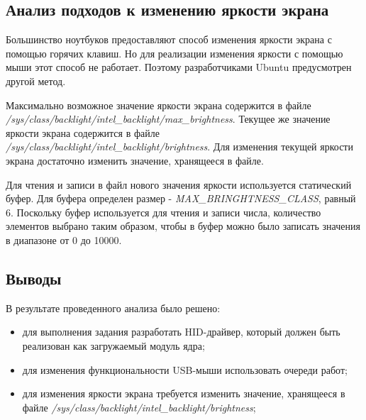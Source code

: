 \subsection{Анализ подходов к изменению яркости экрана}
Большинство ноутбуков предоставляют способ изменения яркости экрана с помощью горячих клавиш.
Но для реализации изменения яркости с помощью мыши этот способ не работает.
Поэтому разработчиками Ubuntu предусмотрен другой метод.

Максимально возможное значение яркости экрана содержится в файле \textit{/sys/class/backlight/intel\_backlight/max\_brightness}.
Текущее же значение яркости экрана содержится в файле \textit{/sys/class/backlight/intel\_backlight/brightness}.
Для изменения текущей яркости экрана достаточно изменить значение, хранящееся в файле.

Для чтения и записи в файл нового значения яркости используется статический буфер. 
Для буфера определен размер - \textit{MAX\_BRINGHTNESS\_CLASS}, равный 6.
Поскольку буфер используется для чтения и записи числа, количество элементов выбрано таким образом, чтобы в буфер можно было записать значения в диапазоне от 0 до 10000.

\newpage
\subsection{Выводы}
В результате проведенного анализа было решено:
\begin{itemize}
	\item для выполнения задания разработать HID-драйвер, который должен быть реализован как загружаемый модуль ядра;
	\item для изменения функциональности USB-мыши использовать очереди работ;
	\item для изменения яркости экрана требуется изменить значение, хранящееся в файле \textit{/sys/class/backlight/intel\_backlight/brightness};
\end{itemize}